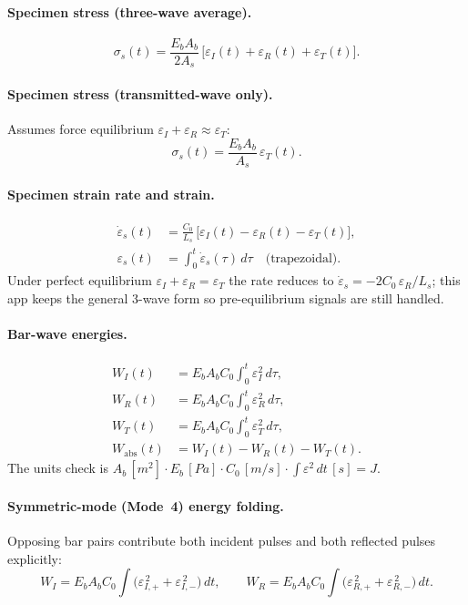 \documentclass[11pt,a4paper]{article}
\newcommand{\sig}{\sigma}
\newcommand{\eps}{\varepsilon}
\newcommand{\epsdot}{\dot\eps}
\newcommand{\Cz}{C_0}
\newcommand{\Ab}{A_b}
\newcommand{\As}{A_s}
\newcommand{\Ls}{L_s}
\begin{document}
\paragraph{Specimen stress (three-wave average).}
\begin{equation}
  \sig_s(t) = \frac{E_b \Ab}{2 \As}\,\bigl[\eps_I(t)+\eps_R(t)+\eps_T(t)\bigr].
\end{equation}

\paragraph{Specimen stress (transmitted-wave only).}  Assumes force equilibrium
$\eps_I + \eps_R \approx \eps_T$:
\begin{equation}
  \sig_s(t) = \frac{E_b \Ab}{\As}\,\eps_T(t).
\end{equation}

\paragraph{Specimen strain rate and strain.}
\begin{align}
  \epsdot_s(t) &= \frac{\Cz}{\Ls}\,\bigl[\eps_I(t)-\eps_R(t)-\eps_T(t)\bigr], \\
  \eps_s(t)   &= \int_0^t \epsdot_s(\tau)\,d\tau \quad \text{(trapezoidal)}.
\end{align}
Under perfect equilibrium $\eps_I + \eps_R = \eps_T$ the rate reduces to
$\epsdot_s = -2\Cz\,\eps_R/\Ls$; this app keeps the general 3-wave form so
pre-equilibrium signals are still handled.

\paragraph{Bar-wave energies.}
\begin{align}
  W_I(t) &= E_b \Ab \Cz \int_0^t \eps_I^2\,d\tau, \\
  W_R(t) &= E_b \Ab \Cz \int_0^t \eps_R^2\,d\tau, \\
  W_T(t) &= E_b \Ab \Cz \int_0^t \eps_T^2\,d\tau, \\
  W_{\text{abs}}(t) &= W_I(t) - W_R(t) - W_T(t).
\end{align}
The units check is
$\Ab\,[\si{m^2}] \cdot E_b\,[\si{Pa}] \cdot \Cz\,[\si{m/s}]
\cdot \int \eps^2\,dt\,[\si{s}] = \si{J}$.

\paragraph{Symmetric-mode (Mode~4) energy folding.}
Opposing bar pairs contribute both incident pulses and both reflected pulses
explicitly:
\begin{equation}
  W_I = E_b \Ab \Cz \int \bigl(\eps_{I,+}^{\,2} + \eps_{I,-}^{\,2}\bigr)\,dt,
  \qquad
  W_R = E_b \Ab \Cz \int \bigl(\eps_{R,+}^{\,2} + \eps_{R,-}^{\,2}\bigr)\,dt.
\end{equation}
\end{document}
